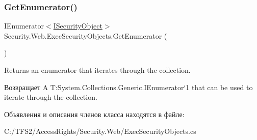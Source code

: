 \subsubsection{\texorpdfstring{Get\+Enumerator()}{GetEnumerator()}}
{\footnotesize\ttfamily I\+Enumerator$<$\hyperlink{interface_security_1_1_interfaces_1_1_i_security_object}{I\+Security\+Object}$>$ Security.\+Web.\+Exec\+Security\+Objects.\+Get\+Enumerator (\begin{DoxyParamCaption}{ }\end{DoxyParamCaption})}



Returns an enumerator that iterates through the collection. 

\begin{DoxyReturn}{Возвращает}
A T\+:\+System.\+Collections.\+Generic.\+I\+Enumerator`1 that can be used to iterate through the collection. 
\end{DoxyReturn}


Объявления и описания членов класса находятся в файле\+:\begin{DoxyCompactItemize}
\item 
C\+:/\+T\+F\+S2/\+Access\+Rights/\+Security.\+Web/Exec\+Security\+Objects.\+cs\end{DoxyCompactItemize}
